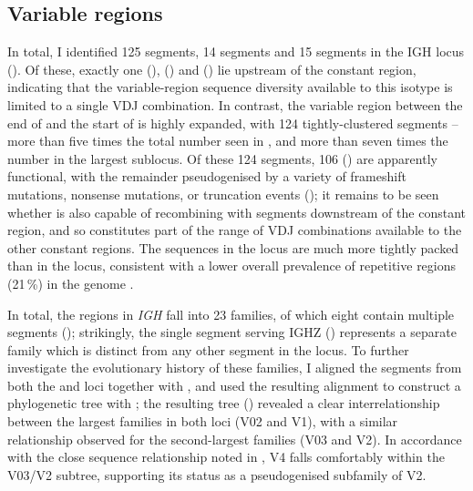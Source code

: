 	
\subsection{Variable regions}
\label{sec:xma-locus-variable}

In total, I identified 125 \vh segments, 14 \dh segments and 15 \jh segments in the \Xma IGH locus (). Of these, exactly one \vh (), \dh () and \jh () lie upstream of the  constant region, indicating that the variable-region sequence diversity available to this isotype is limited to a single VDJ combination. In contrast, the variable region between the end of  and the start of  is highly expanded, with 124 tightly-clustered \vh segments -- more than five times the total number seen in \Nfu, and more than seven times the number in the largest \Nfu sublocus. Of these 124 \vh segments, 106 () are apparently functional, with the remainder pseudogenised by a variety of frameshift mutations, nonsense mutations, or truncation events (); it remains to be seen whether  is also capable of recombining with \dh segments downstream of the  constant region, and so constitutes part of the range of VDJ combinations available to the other constant regions. The \vh sequences in the \Xma locus are much more tightly packed than in the \Nfu locus, consistent with a lower overall prevalence of repetitive regions (21\,\%) in the \Xma genome \parencite{yuan2018repeats}.
	
In total, the \vh regions in \Xma \textit{IGH} fall into 23 families, of which eight contain multiple segments (); strikingly, the single \vh segment serving IGHZ () represents a separate family which is distinct from any other segment in the locus. To further investigate the evolutionary history of these families, I aligned the \vh segments from both the \Xma and \Nfu \igh{} loci together with , and used the resulting alignment to construct a phylogenetic tree with  \parencite{stamatakis2014raxml8,stamatakis2005raxml3,stamatakis2006raxml6}; the resulting tree () revealed a clear interrelationship between the largest families in both loci (\Xma V02 and \Nfu V1), with a similar relationship observed for the second-largest families (\Xma V03 and \Nfu V2). 
In accordance with the close sequence relationship noted in , \Nfu V4 falls comfortably within the V03/V2 subtree, supporting its status as a pseudogenised subfamily of \Nfu V2.
		
